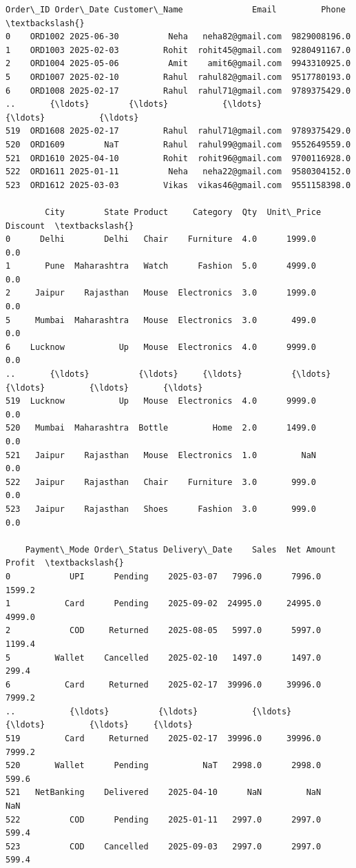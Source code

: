 \documentclass[11pt]{article}
\makeatletter
\newcommand{\boxspacing}{\kern\kvtcb@left@rule\kern\kvtcb@boxsep}
\newcommand{\prompt}[4]{
        {\ttfamily\llap{{\color{#2}[#3]:\hspace{3pt}#4}}\vspace{-\baselineskip}}
    }
\makeatother
\begin{document}
            \begin{tcolorbox}[breakable, size=fbox, boxrule=.5pt, pad at break*=1mm, opacityfill=0]
\prompt{Out}{outcolor}{44}{\boxspacing}
\begin{Verbatim}[commandchars=\\\{\}]
    Order\_ID Order\_Date Customer\_Name              Email         Phone  \textbackslash{}
0    ORD1002 2025-06-30          Neha   neha82@gmail.com  9829008196.0
1    ORD1003 2025-02-03         Rohit  rohit45@gmail.com  9280491167.0
2    ORD1004 2025-05-06          Amit    amit6@gmail.com  9943310925.0
5    ORD1007 2025-02-10         Rahul  rahul82@gmail.com  9517780193.0
6    ORD1008 2025-02-17         Rahul  rahul71@gmail.com  9789375429.0
..       {\ldots}        {\ldots}           {\ldots}                {\ldots}           {\ldots}
519  ORD1608 2025-02-17         Rahul  rahul71@gmail.com  9789375429.0
520  ORD1609        NaT         Rahul  rahul99@gmail.com  9552649559.0
521  ORD1610 2025-04-10         Rohit  rohit96@gmail.com  9700116928.0
522  ORD1611 2025-01-11          Neha   neha22@gmail.com  9580304152.0
523  ORD1612 2025-03-03         Vikas  vikas46@gmail.com  9551158398.0

        City        State Product     Category  Qty  Unit\_Price  Discount  \textbackslash{}
0      Delhi        Delhi   Chair    Furniture  4.0      1999.0       0.0
1       Pune  Maharashtra   Watch      Fashion  5.0      4999.0       0.0
2     Jaipur    Rajasthan   Mouse  Electronics  3.0      1999.0       0.0
5     Mumbai  Maharashtra   Mouse  Electronics  3.0       499.0       0.0
6    Lucknow           Up   Mouse  Electronics  4.0      9999.0       0.0
..       {\ldots}          {\ldots}     {\ldots}          {\ldots}  {\ldots}         {\ldots}       {\ldots}
519  Lucknow           Up   Mouse  Electronics  4.0      9999.0       0.0
520   Mumbai  Maharashtra  Bottle         Home  2.0      1499.0       0.0
521   Jaipur    Rajasthan   Mouse  Electronics  1.0         NaN       0.0
522   Jaipur    Rajasthan   Chair    Furniture  3.0       999.0       0.0
523   Jaipur    Rajasthan   Shoes      Fashion  3.0       999.0       0.0

    Payment\_Mode Order\_Status Delivery\_Date    Sales  Net Amount  Profit  \textbackslash{}
0            UPI      Pending    2025-03-07   7996.0      7996.0  1599.2
1           Card      Pending    2025-09-02  24995.0     24995.0  4999.0
2            COD     Returned    2025-08-05   5997.0      5997.0  1199.4
5         Wallet    Cancelled    2025-02-10   1497.0      1497.0   299.4
6           Card     Returned    2025-02-17  39996.0     39996.0  7999.2
..           {\ldots}          {\ldots}           {\ldots}      {\ldots}         {\ldots}     {\ldots}
519         Card     Returned    2025-02-17  39996.0     39996.0  7999.2
520       Wallet      Pending           NaT   2998.0      2998.0   599.6
521   NetBanking    Delivered    2025-04-10      NaN         NaN     NaN
522          COD      Pending    2025-01-11   2997.0      2997.0   599.4
523          COD    Cancelled    2025-09-03   2997.0      2997.0   599.4


\end{Verbatim}
\end{tcolorbox}
\end{document}
